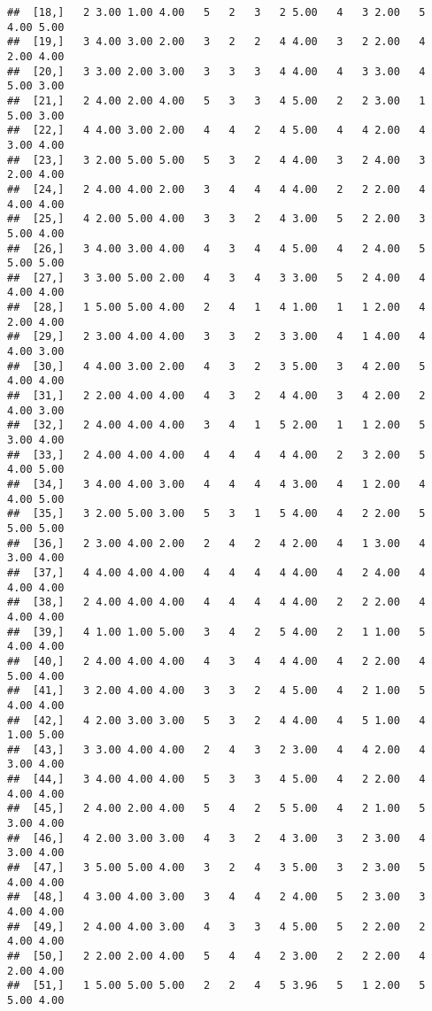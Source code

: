 \documentclass[]{article}
\begin{document}
\begin{verbatim}
##  [18,]   2 3.00 1.00 4.00   5   2   3   2 5.00   4   3 2.00   5 4.00 5.00
##  [19,]   3 4.00 3.00 2.00   3   2   2   4 4.00   3   2 2.00   4 2.00 4.00
##  [20,]   3 3.00 2.00 3.00   3   3   3   4 4.00   4   3 3.00   4 5.00 3.00
##  [21,]   2 4.00 2.00 4.00   5   3   3   4 5.00   2   2 3.00   1 5.00 3.00
##  [22,]   4 4.00 3.00 2.00   4   4   2   4 5.00   4   4 2.00   4 3.00 4.00
##  [23,]   3 2.00 5.00 5.00   5   3   2   4 4.00   3   2 4.00   3 2.00 4.00
##  [24,]   2 4.00 4.00 2.00   3   4   4   4 4.00   2   2 2.00   4 4.00 4.00
##  [25,]   4 2.00 5.00 4.00   3   3   2   4 3.00   5   2 2.00   3 5.00 4.00
##  [26,]   3 4.00 3.00 4.00   4   3   4   4 5.00   4   2 4.00   5 5.00 5.00
##  [27,]   3 3.00 5.00 2.00   4   3   4   3 3.00   5   2 4.00   4 4.00 4.00
##  [28,]   1 5.00 5.00 4.00   2   4   1   4 1.00   1   1 2.00   4 2.00 4.00
##  [29,]   2 3.00 4.00 4.00   3   3   2   3 3.00   4   1 4.00   4 4.00 3.00
##  [30,]   4 4.00 3.00 2.00   4   3   2   3 5.00   3   4 2.00   5 4.00 4.00
##  [31,]   2 2.00 4.00 4.00   4   3   2   4 4.00   3   4 2.00   2 4.00 3.00
##  [32,]   2 4.00 4.00 4.00   3   4   1   5 2.00   1   1 2.00   5 3.00 4.00
##  [33,]   2 4.00 4.00 4.00   4   4   4   4 4.00   2   3 2.00   5 4.00 5.00
##  [34,]   3 4.00 4.00 3.00   4   4   4   4 3.00   4   1 2.00   4 4.00 5.00
##  [35,]   3 2.00 5.00 3.00   5   3   1   5 4.00   4   2 2.00   5 5.00 5.00
##  [36,]   2 3.00 4.00 2.00   2   4   2   4 2.00   4   1 3.00   4 3.00 4.00
##  [37,]   4 4.00 4.00 4.00   4   4   4   4 4.00   4   2 4.00   4 4.00 4.00
##  [38,]   2 4.00 4.00 4.00   4   4   4   4 4.00   2   2 2.00   4 4.00 4.00
##  [39,]   4 1.00 1.00 5.00   3   4   2   5 4.00   2   1 1.00   5 4.00 4.00
##  [40,]   2 4.00 4.00 4.00   4   3   4   4 4.00   4   2 2.00   4 5.00 4.00
##  [41,]   3 2.00 4.00 4.00   3   3   2   4 5.00   4   2 1.00   5 4.00 4.00
##  [42,]   4 2.00 3.00 3.00   5   3   2   4 4.00   4   5 1.00   4 1.00 5.00
##  [43,]   3 3.00 4.00 4.00   2   4   3   2 3.00   4   4 2.00   4 3.00 4.00
##  [44,]   3 4.00 4.00 4.00   5   3   3   4 5.00   4   2 2.00   4 4.00 4.00
##  [45,]   2 4.00 2.00 4.00   5   4   2   5 5.00   4   2 1.00   5 3.00 4.00
##  [46,]   4 2.00 3.00 3.00   4   3   2   4 3.00   3   2 3.00   4 3.00 4.00
##  [47,]   3 5.00 5.00 4.00   3   2   4   3 5.00   3   2 3.00   5 4.00 4.00
##  [48,]   4 3.00 4.00 3.00   3   4   4   2 4.00   5   2 3.00   3 4.00 4.00
##  [49,]   2 4.00 4.00 3.00   4   3   3   4 5.00   5   2 2.00   2 4.00 4.00
##  [50,]   2 2.00 2.00 4.00   5   4   4   2 3.00   2   2 2.00   4 2.00 4.00
##  [51,]   1 5.00 5.00 5.00   2   2   4   5 3.96   5   1 2.00   5 5.00 4.00

\end{verbatim}
\end{document}
